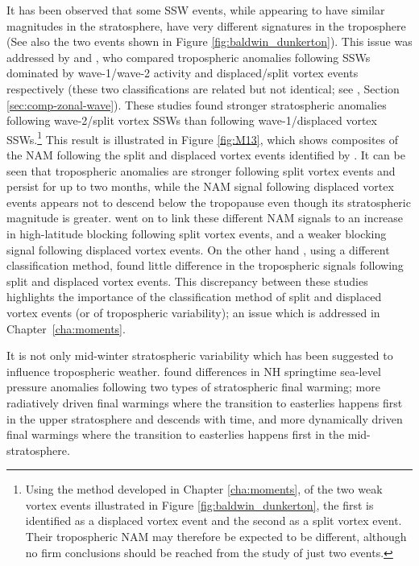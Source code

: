 It has been observed that some SSW events, while appearing to have similar
magnitudes in the stratosphere, have very different signatures in the
troposphere \citep[e.g.,][]{Baldwin2001a,Tomassini2012} (See also the two events
shown in Figure \ref{fig:baldwin_dunkerton}). This issue was addressed by
\citet{Nakagawa2006} and \citet{Mitchell2013}, who compared tropospheric
anomalies following SSWs dominated by wave-1/wave-2 activity and displaced/split
vortex events respectively (these two classifications are related but not
identical; see \citet{Waugh1997}, Section \ref{sec:comp-zonal-wave}). These
studies found stronger stratospheric anomalies following wave-2/split vortex
SSWs than following wave-1/displaced vortex SSWs.\footnote{Using the method
  developed in Chapter \ref{cha:moments}, of the two weak vortex events
  illustrated in Figure \ref{fig:baldwin_dunkerton}, the first is identified as
  a displaced vortex event and the second as a split vortex event. Their
  tropospheric NAM may therefore be expected to be different, although no firm
  conclusions should be reached from the study of just two events.} This result
is illustrated in Figure \ref{fig:M13}, which shows composites of the NAM
following the split and displaced vortex events identified by
\citet{Mitchell2013}. It can be seen that tropospheric anomalies are stronger
following split vortex events and persist for up to two months, while the NAM
signal following displaced vortex events appears not to descend below the
tropopause even though its stratospheric magnitude is
greater. \citet{Mitchell2013} went on to link these different NAM signals to an
increase in high-latitude blocking following split vortex events, and a weaker
blocking signal following displaced vortex events. On the other hand
\citet{Charlton2007}, using a different classification method, found little
difference in the tropospheric signals following split and displaced vortex
events. This discrepancy between these studies highlights the importance of the
classification method of split and displaced vortex events (or of tropospheric
variability); an issue which is addressed in Chapter~\ref{cha:moments}.

It is not only mid-winter stratospheric variability which has been suggested to
influence tropospheric weather. \citet{Hardiman2011} found differences
in NH springtime sea-level pressure anomalies following two types of
stratospheric final warming; more radiatively driven final warmings where the
transition to easterlies happens first in the upper stratosphere and descends
with time, and more dynamically driven final warmings where the transition to
easterlies happens first in the mid-stratosphere.  

